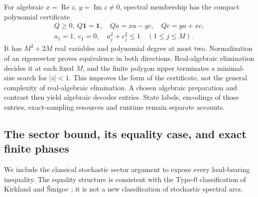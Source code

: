 For algebraic $x=\operatorname{Re}z$, $y=\operatorname{Im}z\ne0$, spectral membership has the compact polynomial certificate
\begin{equation}\label{eq:r69-bilinear}
 \begin{gathered}
 Q\ge0,\ Q\mathbf1=\mathbf1,\quad
 Qa=xa-yc,\quad Qc=ya+xc,\\
 a_1=1,\ c_1=0,\quad a_j^2+c_j^2\le1\quad(1\le j\le M).
 \end{gathered}
\end{equation}
It has $M^2+2M$ real variables and polynomial degree at most two. Normalization of an eigenvector proves equivalence in both directions. Real-algebraic elimination decides it at each fixed $M$, and the finite polygon upper terminates a minimal-size search for $|z|<1$. This improves the form of the certificate, not the general complexity of real-algebraic elimination. A chosen algebraic preparation and contrast then yield algebraic decoder entries. State labels, encodings of those entries, exact-sampling resources and runtime remain separate accounts.

\subsection{The sector bound, its equality case, and exact finite phases}
We include the classical stochastic sector argument to expose every load-bearing inequality. The equality structure is consistent with the Type-0 classification of Kirkland and \v Smigoc \cite{KirklandSmigoc22}; it is not a new classification of stochastic spectral arcs.

